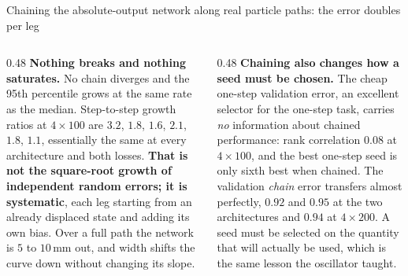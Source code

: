 \documentclass[aspectratio=169,10pt]{beamer}
\newcommand{\mm}{\ensuremath{\,\mathrm{mm}}}
\newcommand{\hl}[1]{{\color{accent}\textbf{#1}}}
\newcommand{\bad}[1]{{\color{warm}\textbf{#1}}}
\begin{document}
\begin{frame}[shrink=25]{Chaining the absolute-output network along real particle paths: the error doubles per leg}
  \begin{columns}[T]
    \begin{column}{0.48\textwidth}
      {\small \hl{Nothing breaks and nothing saturates.} No chain diverges and
       the 95th percentile grows at the same rate as the median. Step-to-step
       growth ratios at $4\times100$ are $3.2$, $1.8$, $1.6$, $2.1$, $1.8$,
       $1.1$, essentially the same at every architecture and both losses.
       \bad{That is not the square-root growth of independent random errors; it
       is systematic}, each leg starting from an already displaced state and
       adding its own bias. Over a full path the network is $5$ to $10\mm$ out,
       and width shifts the curve down without changing its slope.}
    \end{column}
    \begin{column}{0.48\textwidth}
      {\small \hl{Chaining also changes how a seed must be chosen.} The cheap
       one-step validation error, an excellent selector for the one-step task,
       carries \emph{no} information about chained performance: rank correlation
       $0.08$ at $4\times100$, and the best one-step seed is only sixth best
       when chained. The validation \emph{chain} error transfers almost
       perfectly, $0.92$ and $0.95$ at the two architectures and $0.94$ at
       $4\times200$. A seed must be selected on the quantity that will actually
       be used, which is the same lesson the oscillator taught.}
    \end{column}
  \end{columns}
\end{frame}
\end{document}
